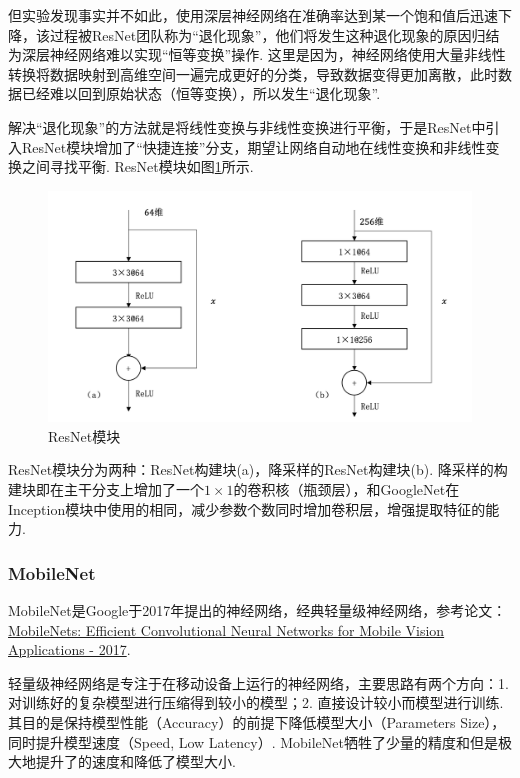 \documentclass[12pt, a4paper, oneside]{ctexart}
\numberwithin{equation}{section}  %
\begin{document}
但实验发现事实并不如此，使用深层神经网络在准确率达到某一个饱和值后迅速下降，该过程被ResNet团队称为“退化现象”，他们将发生这种退化现象的原因归结为深层神经网络难以实现“恒等变换”操作. 这里是因为，神经网络使用大量非线性转换将数据映射到高维空间一遍完成更好的分类，导致数据变得更加离散，此时数据已经难以回到原始状态（恒等变换），所以发生“退化现象”.

解决“退化现象”的方法就是将线性变换与非线性变换进行平衡，于是ResNet中引入ResNet模块增加了“快捷连接”分支，期望让网络自动地在线性变换和非线性变换之间寻找平衡. ResNet模块如图\ref{fig-ResNet}所示.
\begin{figure}[htbp]
  \centering
  \includegraphics[scale=0.8]{ResNet模块.png}
  \caption{ResNet模块\protect\footnotemark[1]}
  \label{fig-ResNet}
\end{figure}

ResNet模块分为两种：ResNet构建块(a)，降采样的ResNet构建块(b). 降采样的构建块即在主干分支上增加了一个$1\times 1$的卷积核（瓶颈层），和GoogleNet在Inception模块中使用的相同，减少参数个数同时增加卷积层，增强提取特征的能力.

\subsubsection{MobileNet}
MobileNet是Google于2017年提出的神经网络，经典轻量级神经网络，参考论文：\href{https://arxiv.org/pdf/1704.04861.pdf}{MobileNets: Efficient Convolutional Neural Networks for Mobile Vision Applications - 2017}.

轻量级神经网络是专注于在移动设备上运行的神经网络，主要思路有两个方向：1. 对训练好的复杂模型进行压缩得到较小的模型；2. 直接设计较小而模型进行训练. 其目的是保持模型性能（Accuracy）的前提下降低模型大小（Parameters Size），同时提升模型速度（Speed, Low Latency）. MobileNet牺牲了少量的精度和但是极大地提升了的速度和降低了模型大小.
\end{document}
